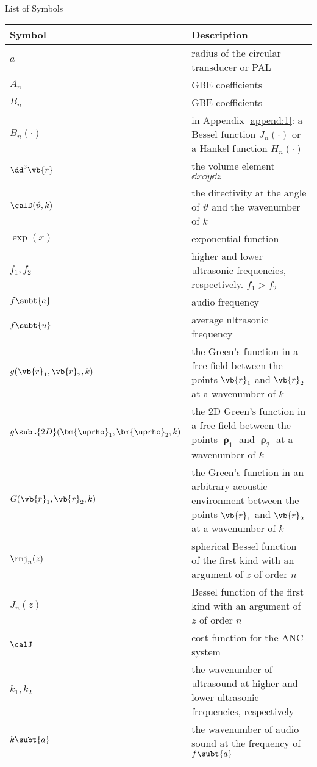 \begin{frontmatterpage}{List of Symbols}
    \begin{longtable}[H]{lp{}}
        \toprule
            \textbf{Symbol} & \textbf{Description} \\ 
        \midrule
            $a$ & radius of the circular transducer or PAL  \\
            $A_n$ & GBE coefficients\\
            $B_n$ & GBE coefficients\\
            $B_n(\cdot)$ & in Appendix \ref{append:1}: a Bessel function $J_n(\cdot)$ or a Hankel function $H_n(\cdot)$  \\
            $\dd^3 \vb{r}$ & the volume element $\dd x \dd y \dd z$ \\
            $\calD(\vartheta, k)$ & the directivity  at the angle of $\vartheta$ and the wavenumber of $k$\\
            $\exp(x)$ & exponential function \\
            $f_1, f_2$ & higher and lower ultrasonic frequencies, respectively. $f_1>f_2$\\
            $f\subt{a}$ & audio frequency\\
            $f\subt{u}$ & average ultrasonic frequency\\
            $g(\vb{r}_1,\vb{r}_2,k)$ & the Green's function in a free field between the points $\vb{r}_1$ and $\vb{r}_2$ at a wavenumber of $k$ \\
            $g\subt{2D}(\bm{\uprho}_1,\bm{\uprho}_2,k)$ & the 2D Green's function in a free field between the points $\bm{\uprho}_1$ and $\bm{\uprho}_2$ at a wavenumber of $k$ \\
            $G(\vb{r}_1,\vb{r}_2,k)$ & the Green's function in an arbitrary acoustic environment between the points $\vb{r}_1$ and $\vb{r}_2$ at a wavenumber of $k$ \\
            $\rmj_n(z)$ & spherical Bessel function of the first kind with an argument of $z$ of order $n$\\
            $J_n(z)$ & Bessel function of the first kind with an argument of $z$ of order $n$\\
            $\calJ$ & cost function for the ANC system \\
            $k_1,k_2$ & the wavenumber of ultrasound at higher and lower ultrasonic frequencies, respectively\\
            $k\subt{a}$ & the wavenumber of audio sound at the frequency of $f\subt{a}$\\

\end{longtable}
\end{frontmatterpage}
